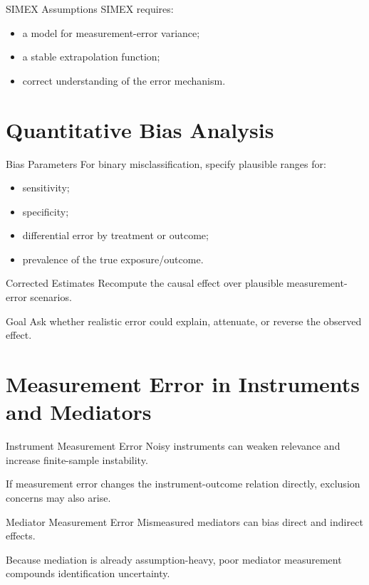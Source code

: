 \documentclass[aspectratio=169,11pt]{beamer}
\begin{document}
\begin{frame}{SIMEX Assumptions}
SIMEX requires:
\begin{itemize}
\item a model for measurement-error variance;
\item a stable extrapolation function;
\item correct understanding of the error mechanism.
\end{itemize}
\end{frame}

\section{Quantitative Bias Analysis}

\begin{frame}{Bias Parameters}
For binary misclassification, specify plausible ranges for:
\begin{itemize}
\item sensitivity;
\item specificity;
\item differential error by treatment or outcome;
\item prevalence of the true exposure/outcome.
\end{itemize}
\end{frame}

\begin{frame}{Corrected Estimates}
Recompute the causal effect over plausible measurement-error scenarios.

\begin{block}{Goal}
Ask whether realistic error could explain, attenuate, or reverse the observed effect.
\end{block}
\end{frame}

\section{Measurement Error in Instruments and Mediators}

\begin{frame}{Instrument Measurement Error}
Noisy instruments can weaken relevance and increase finite-sample instability.

If measurement error changes the instrument-outcome relation directly, exclusion concerns may also arise.
\end{frame}

\begin{frame}{Mediator Measurement Error}
Mismeasured mediators can bias direct and indirect effects.

Because mediation is already assumption-heavy, poor mediator measurement compounds identification uncertainty.
\end{frame}
\end{document}
